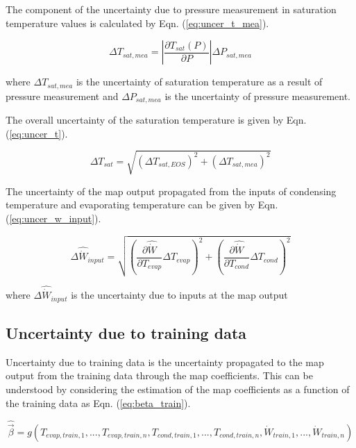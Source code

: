 The component of the uncertainty due to pressure measurement in saturation temperature values is calculated by Eqn. (\ref{eq:uncer_t_mea}).

\begin{equation}
\Delta {T_{sat,mea}} = \left|\frac{{\partial {T_{sat}}({P})}}{{\partial {P}}}\right|\Delta {P_{sat,mea}}
\label{eq:uncer_t_mea}
\end{equation}

where $\Delta {T_{sat,mea}}$ is the uncertainty of saturation temperature as a result of pressure measurement and $\Delta P_{sat,mea}$ is the uncertainty of pressure measurement.

The overall uncertainty of the saturation temperature is given by Eqn. (\ref{eq:uncer_t}).

\begin{equation}
\Delta {T_{sat}} = \sqrt {{{(\Delta {T_{sat,EOS}})}^2} + {{(\Delta {T_{sat,mea}})}^2}}
\label{eq:uncer_t}
\end{equation}

The uncertainty of the map output propagated from the inputs of condensing temperature and evaporating temperature can be given by Eqn. (\ref{eq:uncer_w_input}).

\begin{equation}
\Delta {\hat{\dot{W}}_{input}} = \sqrt {{\left(\frac{{\partial \hat{\dot{W}}}}{{\partial {T_{evap}}}}\Delta {T_{evap}}\right)^2} + {\left(\frac{{\partial \hat{\dot{W}}}}{{\partial {T_{cond}}}}\Delta {T_{cond}}\right)^2}}
\label{eq:uncer_w_input}
\end{equation}

where $\Delta {\hat{\dot{W}}_{input}}$ is the uncertainty due to inputs at the map output

\subsection{Uncertainty due to training data} \label{subsec:uncer_train}
Uncertainty due to training data is the uncertainty propagated to the map output from the training data through the map coefficients. This can be understood by considering the estimation of the map coefficients as a function of the training data as Eqn. (\ref{eq:beta_train}).

\begin{equation}
\hat{ \vec {\beta}}  = g({T_{evap,train,1}},...,{T_{evap,train,n}},{T_{cond,train,1}},...,{T_{cond,train,n}},{\dot{W}_{train,1}},...,{\dot{W}_{train,n}})
\label{eq:beta_train}
\end{equation}

